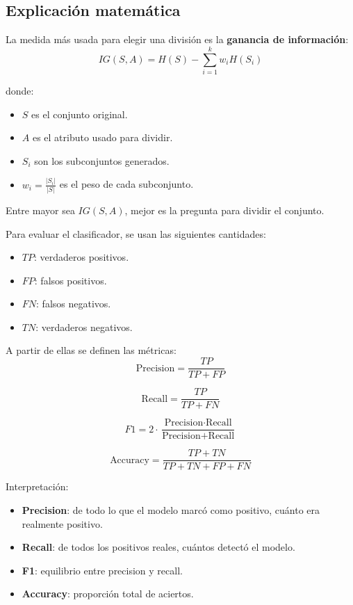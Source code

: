\documentclass[12pt]{article}
\begin{document}
\subsection{Explicación matemática}
La medida más usada para elegir una división es la \textbf{ganancia de información}:
\[
IG(S,A) = H(S) - \sum_{i=1}^{k} w_i H(S_i)
\]

donde:
\begin{itemize}
    \item \(S\) es el conjunto original.
    \item \(A\) es el atributo usado para dividir.
    \item \(S_i\) son los subconjuntos generados.
    \item \(w_i = \frac{|S_i|}{|S|}\) es el peso de cada subconjunto.
\end{itemize}

Entre mayor sea \(IG(S,A)\), mejor es la pregunta para dividir el conjunto.

Para evaluar el clasificador, se usan las siguientes cantidades:
\begin{itemize}
    \item \(TP\): verdaderos positivos.
    \item \(FP\): falsos positivos.
    \item \(FN\): falsos negativos.
    \item \(TN\): verdaderos negativos.
\end{itemize}

A partir de ellas se definen las métricas:
\[
\text{Precision} = \frac{TP}{TP+FP}
\]

\[
\text{Recall} = \frac{TP}{TP+FN}
\]

\[
F1 = 2 \cdot \frac{\text{Precision} \cdot \text{Recall}}{\text{Precision} + \text{Recall}}
\]

\[
\text{Accuracy} = \frac{TP+TN}{TP+TN+FP+FN}
\]

Interpretación:
\begin{itemize}
    \item \textbf{Precision}: de todo lo que el modelo marcó como positivo, cuánto era realmente positivo.
    \item \textbf{Recall}: de todos los positivos reales, cuántos detectó el modelo.
    \item \textbf{F1}: equilibrio entre precision y recall.
    \item \textbf{Accuracy}: proporción total de aciertos.
\end{itemize}
\end{document}
